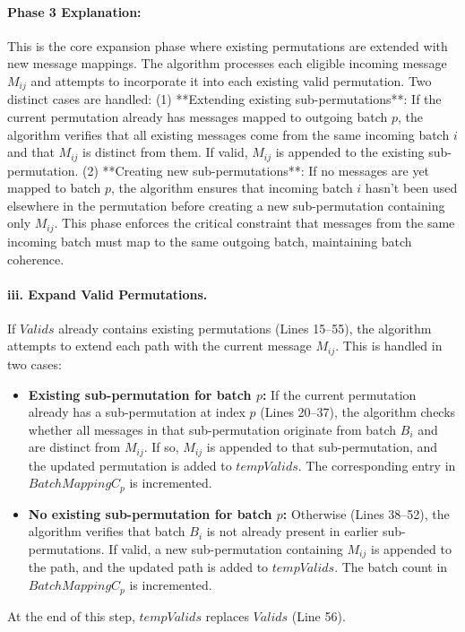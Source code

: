 \documentclass{article}
\begin{document}
\paragraph{Phase 3 Explanation:}
This is the core expansion phase where existing permutations are extended with new message mappings. The algorithm processes each eligible incoming message $M_{ij}$ and attempts to incorporate it into each existing valid permutation. Two distinct cases are handled: (1) **Extending existing sub-permutations**: If the current permutation already has messages mapped to outgoing batch $p$, the algorithm verifies that all existing messages come from the same incoming batch $i$ and that $M_{ij}$ is distinct from them. If valid, $M_{ij}$ is appended to the existing sub-permutation. (2) **Creating new sub-permutations**: If no messages are yet mapped to batch $p$, the algorithm ensures that incoming batch $i$ hasn't been used elsewhere in the permutation before creating a new sub-permutation containing only $M_{ij}$. This phase enforces the critical constraint that messages from the same incoming batch must map to the same outgoing batch, maintaining batch coherence.

\paragraph{iii. Expand Valid Permutations.}
If $Valids$ already contains existing permutations (Lines 15–55), the algorithm attempts to extend each path with the current message $M_{ij}$.  
This is handled in two cases:  
\begin{itemize}
    \item \textbf{Existing sub-permutation for batch $p$:} If the current permutation already has a sub-permutation at index $p$ (Lines 20–37), the algorithm checks whether all messages in that sub-permutation originate from batch $B_i$ and are distinct from $M_{ij}$. If so, $M_{ij}$ is appended to that sub-permutation, and the updated permutation is added to $tempValids$. The corresponding entry in $BatchMappingC_p$ is incremented.
    \item \textbf{No existing sub-permutation for batch $p$:} Otherwise (Lines 38–52), the algorithm verifies that batch $B_i$ is not already present in earlier sub-permutations. If valid, a new sub-permutation containing $M_{ij}$ is appended to the path, and the updated path is added to $tempValids$. The batch count in $BatchMappingC_p$ is incremented.
\end{itemize}
At the end of this step, $tempValids$ replaces $Valids$ (Line 56).
\end{document}
